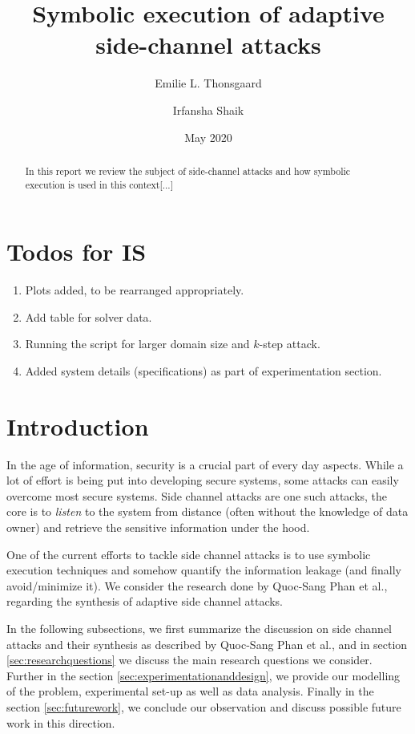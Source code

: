\documentclass[11pt,a4paper,notitlepage]{article}
\title{Symbolic execution of adaptive side-channel attacks}
\author{Emilie L. Thonsgaard \and Irfansha Shaik}
\date{May 2020}
\begin{document}
\begin{titlingpage}
    \maketitle
    \begin{abstract}
        In this report we review the subject of side-channel attacks and how symbolic execution is used in this context[...]
    \end{abstract}
\end{titlingpage}

\tableofcontents
\newpage
\setcounter{section}{-1}


\section{Todos for IS}
\label{sec:todosforis}

\begin{enumerate}
  \item Plots added, to be rearranged appropriately.
  \item Add table for solver data.
  \item Running the script for larger domain size and $k$-step attack.
  \item Added system details (specifications) as part of experimentation section.
\end{enumerate}

\newpage

\section{Introduction}
\label{cha:introduction}

In the age of information, security is a crucial part of every day aspects.
While a lot of effort is being put into developing secure systems, some attacks can easily overcome most secure systems.
Side channel attacks are one such attacks, the core is to \emph{listen} to the system from distance (often without the knowledge of data owner) and retrieve the sensitive information under the hood.

One of the current efforts to tackle side channel attacks is to use symbolic execution techniques and somehow quantify the information leakage (and finally avoid/minimize it).
We consider the research done by Quoc-Sang Phan et al., \cite{phan2017synthesis} regarding the synthesis of adaptive side channel attacks.

In the following subsections, we first summarize the discussion on side channel attacks and their synthesis as described by Quoc-Sang Phan et al., and in section \ref{sec:researchquestions} we discuss the main research questions we consider.
Further in the section \ref{sec:experimentationanddesign}, we provide our modelling of the problem, experimental set-up as well as data analysis.
Finally in the section \ref{sec:futurework}, we conclude our observation and discuss possible future work in this direction.
\end{document}
